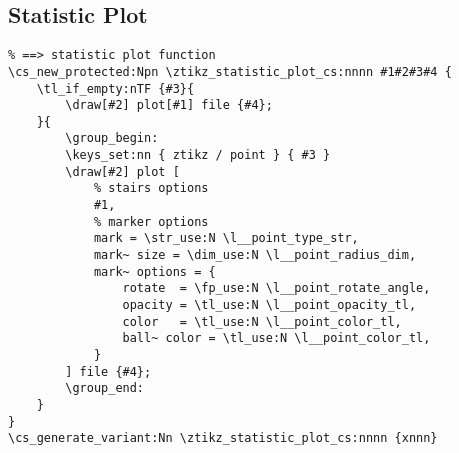 \subsection{Statistic Plot}
\begin{verbatim}
% ==> statistic plot function
\cs_new_protected:Npn \ztikz_statistic_plot_cs:nnnn #1#2#3#4 {
    \tl_if_empty:nTF {#3}{
        \draw[#2] plot[#1] file {#4};
    }{
        \group_begin:
        \keys_set:nn { ztikz / point } { #3 }
        \draw[#2] plot [
            % stairs options
            #1,
            % marker options
            mark = \str_use:N \l__point_type_str, 
            mark~ size = \dim_use:N \l__point_radius_dim,
            mark~ options = {
                rotate  = \fp_use:N \l__point_rotate_angle, 
                opacity = \tl_use:N \l__point_opacity_tl, 
                color   = \tl_use:N \l__point_color_tl,
                ball~ color = \tl_use:N \l__point_color_tl,
            }
        ] file {#4};
        \group_end:
    }
}
\cs_generate_variant:Nn \ztikz_statistic_plot_cs:nnnn {xnnn}


\end{verbatim}

